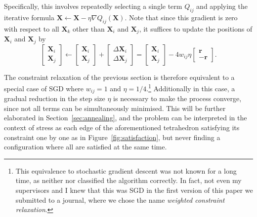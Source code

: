 Specifically, this involves repeatedly selecting a single term $Q_{ij}$ and applying the iterative formula $\mathbf{X}\leftarrow \mathbf{X}-\eta\nabla Q_{ij}(\mathbf{X})$.
Note that since this gradient is zero with respect to all $\mathbf{X}_k$ other than $\mathbf{X}_i$ and $\mathbf{X}_j$, it suffices to update the positions of $\mathbf{X}_i$ and $\mathbf{X}_j$ by
\begin{equation}
  \begin{bmatrix}\mathbf{X}_i\\\mathbf{X}_j\end{bmatrix}
  \leftarrow
  \begin{bmatrix}\mathbf{X}_i\\\mathbf{X}_j\end{bmatrix}+
  \begin{bmatrix}\Delta \mathbf{X}_i\\\Delta \mathbf{X}_j\end{bmatrix}
  =
  \begin{bmatrix}\mathbf{X}_i\\\mathbf{X}_j\end{bmatrix}-
  4w_{ij}\eta
  \begin{bmatrix}\mathbf{r}\\-\mathbf{r}\end{bmatrix}.
  \label{eq:SGD_step}
\end{equation}

The constraint relaxation of the previous section is therefore equivalent to a special case of SGD where $w_{ij}=1$ and $\eta=1/4$.\footnote{This equivalence to stochastic gradient descent was not known for a long time, as neither \citet{Jakobsen2001} nor \citet{Dwyer2009} classified the algorithm correctly. In fact, not even my supervisors and I knew that this was SGD in the first version of this paper we submitted to a journal, where we chose the name \emph{weighted constraint relaxation}.}
Additionally in this case, a gradual reduction in the step size $\eta$ is necessary to make the process converge, since not all terms can be simultaneously minimised. This will be further elaborated in Section~\ref{sec:annealing}, and the problem can be interpreted in the context of stress as each edge of the aforementioned tetrahedron satisfying its constraint one by one as in Figure~\ref{fig:satisfaction}, but never finding a configuration where all are satisfied at the same time.

